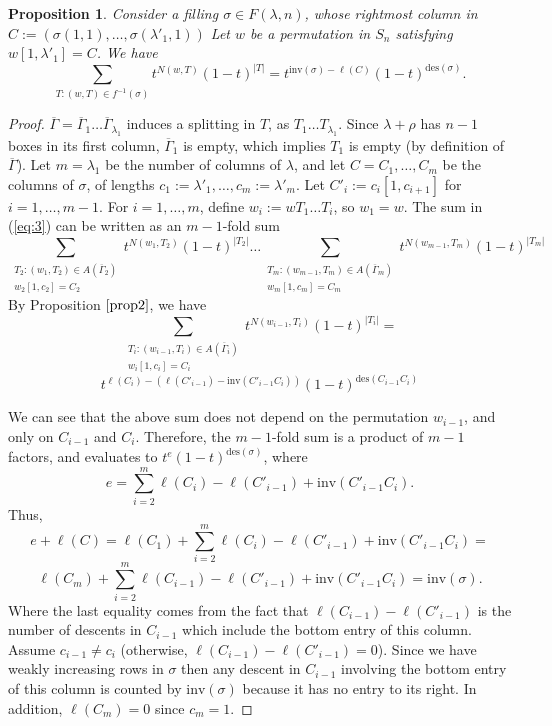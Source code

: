 \documentclass[11pt]{amsart}
\newtheorem{prop}{Proposition}[section]
\begin{document}
{\begin{prop}\label{prop3}
Consider a filling $\sigma \in F(\lambda, n)$, whose rightmost column in \newline $C:=(\sigma(1,1), \ldots, \sigma(\lambda'_{1},1))$ Let $w$ be a permutation in $S_{n}$ satisfying $w[1,\lambda'_{1}]=C$. We have 
\begin{equation}\label{eq:3}
\sum_{T:(w,T)\in f^{-1}(\sigma)}t^{N(w,T)}(1-t)^{|T|}=t^{\textrm{inv}(\sigma)-\ell(C)}(1-t)^{\textrm{des}(\sigma)}.
\end{equation}
\end{prop}
\begin{proof}
$\overline{\Gamma}=\overline{\Gamma}_{1}\ldots \overline{\Gamma}_{\lambda_{1}}$ induces a splitting in $T$, as $T_{1}\ldots T_{\lambda_{1}}$. Since $\lambda+\rho$ has $n-1$ boxes in its first column, $\overline{\Gamma}_{1}$ is empty, which implies $T_{1}$ is empty (by definition of $\overline{\Gamma}$). Let $m=\lambda_{1}$ be the number of columns of $\lambda$, and let $C=C_{1}, \ldots, C_{m}$ be the columns of $\sigma$, of lengths $c_{1}:=\lambda'_{1},\ldots, c_{m}:=\lambda'_{m}$. Let $C'_{i}:=c_{i}[1,c_{i+1}]$ for $i=1,\ldots,m-1$. For $i=1,\ldots,m$, define $w_{i}:=wT_{1}\ldots T_{i}$, so $w_{1}=w$. The sum in (\ref{eq:3}) can be written as an $m-1$-fold sum 
\begin{equation*}
\sum_{\substack{T_{2}:(w_{1},T_{2})\in A(\overline{\Gamma}_{2})\\ w_{2}[1,c_{2}]=C_{2}}}t^{N(w_{1},T_{2})}(1-t)^{|T_{2}|}\ldots \sum_{\substack{T_{m}:(w_{m-1},T_{m})\in A(\overline{\Gamma}_{m})\\w_{m}[1,c_{m}]=C_{m}}}t^{N(w_{m-1},T_{m})}(1-t)^{|T_{m}|}
\end{equation*}
By Proposition $\ref{prop2}$, we have 
\[
\sum_{\substack{T_{i}:(w_{i-1},T_{i})\in A(\overline{\Gamma}_{i})\\w_{i}[1,c_{i}]=C_{i}}}t^{N(w_{i-1},T_{i})}(1-t)^{|T_{i}|}=
\]
\[
 t^{\ell(C_{i})-(\ell(C'_{i-1})-\textrm{inv}(C'_{i-1}C_{i}))}(1-t)^{\textrm{des}(C_{i-1}C_{i})}
 \]

We can see that the above sum does not depend on the permutation $w_{i-1}$, and only on $C_{i-1}$ and $C_{i}$. Therefore, the $m-1$-fold sum is a product of $m-1$ factors, and evaluates to $t^{e}(1-t)^{\textrm{des}(\sigma)}$, where 
\begin{equation*}
e=\sum_{i=2}^{m}\ell(C_{i})-\ell(C'_{i-1})+\textrm{inv}(C'_{i-1}C_{i}).
\end{equation*}  
Thus,
\[e+\ell(C)=\ell(C_{1})+\sum_{i=2}^{m}\ell(C_{i})-\ell(C'_{i-1})+\textrm{inv}(C'_{i-1}C_{i})=
\]
\[
 \ell(C_{m})+\sum_{i=2}^{m}\ell(C_{i-1})-\ell(C'_{i-1})+\textrm{inv}(C'_{i-1}C_{i})=\textrm{inv}(\sigma).
\]
Where the last equality comes from the fact that $\ell(C_{i-1})-\ell(C'_{i-1})$ is the number of descents in $C_{i-1}$ which include the bottom entry of this column. Assume $c_{i-1}\not = c_{i}$ (otherwise, $\ell(C_{i-1})-\ell(C'_{i-1})=0$). Since we have weakly increasing rows in $\sigma$ then any descent in $C_{i-1}$ involving the bottom entry of this column is counted by $\textrm{inv}(\sigma)$ because it has no entry to its right. In addition, $\ell(C_{m})=0$ since $c_{m}=1$.
\end{proof}

}
\end{document}
